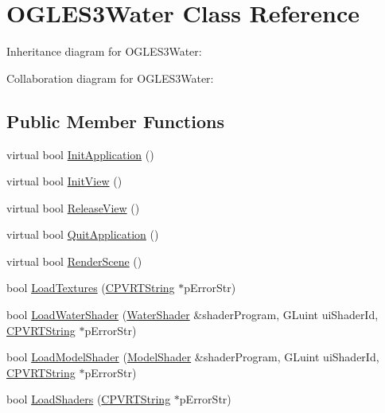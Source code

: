 \hypertarget{class_o_g_l_e_s3_water}{\section{O\+G\+L\+E\+S3\+Water Class Reference}
\label{class_o_g_l_e_s3_water}
}


Inheritance diagram for O\+G\+L\+E\+S3\+Water\+:


Collaboration diagram for O\+G\+L\+E\+S3\+Water\+:
\subsection*{Public Member Functions}
\begin{DoxyCompactItemize}
\item 
virtual bool \hyperlink{class_o_g_l_e_s3_water_ad91e5c6f2c7289d1dd9466a0acfe5f31}{Init\+Application} ()
\item 
virtual bool \hyperlink{class_o_g_l_e_s3_water_a25e025258e7aa9898269ba644ded3dd5}{Init\+View} ()
\item 
virtual bool \hyperlink{class_o_g_l_e_s3_water_a4df8a28b1a6f9dc7d9d972a51c59b0f1}{Release\+View} ()
\item 
virtual bool \hyperlink{class_o_g_l_e_s3_water_a2ee543e5d26c2b0b73958a6b703d26fd}{Quit\+Application} ()
\item 
virtual bool \hyperlink{class_o_g_l_e_s3_water_aeab9e7a6214b0b72691879ad5d5584ad}{Render\+Scene} ()
\item 
bool \hyperlink{class_o_g_l_e_s3_water_a97b14e60c16a2d1175adf1549722e77b}{Load\+Textures} (\hyperlink{class_c_p_v_r_t_string}{C\+P\+V\+R\+T\+String} $\ast$p\+Error\+Str)
\item 
bool \hyperlink{class_o_g_l_e_s3_water_a9be128445fb42b1690a50fe5b30c0e7d}{Load\+Water\+Shader} (\hyperlink{struct_water_shader}{Water\+Shader} \&shader\+Program, G\+Luint ui\+Shader\+Id, \hyperlink{class_c_p_v_r_t_string}{C\+P\+V\+R\+T\+String} $\ast$p\+Error\+Str)
\item 
bool \hyperlink{class_o_g_l_e_s3_water_ae40357428136aac40f95a6b2d66842f2}{Load\+Model\+Shader} (\hyperlink{struct_model_shader}{Model\+Shader} \&shader\+Program, G\+Luint ui\+Shader\+Id, \hyperlink{class_c_p_v_r_t_string}{C\+P\+V\+R\+T\+String} $\ast$p\+Error\+Str)
\item 
bool \hyperlink{class_o_g_l_e_s3_water_a93e2440f7f96cb254daa7cfd1d68991c}{Load\+Shaders} (\hyperlink{class_c_p_v_r_t_string}{C\+P\+V\+R\+T\+String} $\ast$p\+Error\+Str)
\item 

\end{DoxyCompactItemize}
